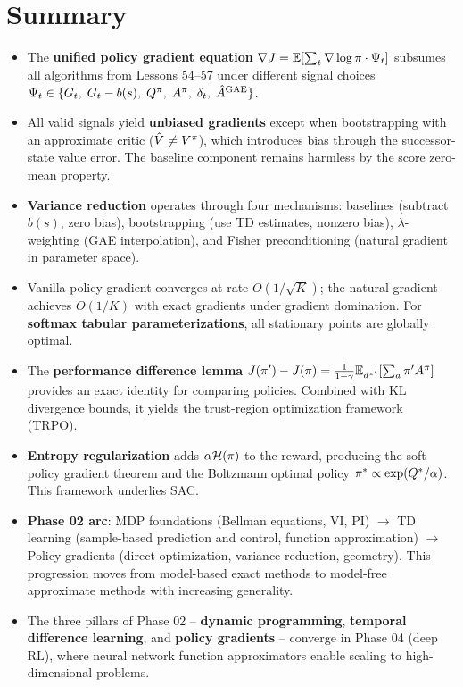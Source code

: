 \documentclass[11pt,a4paper]{article}
\begin{document}
\section{Summary}

\begin{itemize}
  \item The \textbf{unified policy gradient equation}
    $\nabla J = \mathbb{E}[\sum_t \nabla \log \pi \cdot \Psi_t]$ subsumes
    all algorithms from Lessons 54--57 under different signal choices
    $\Psi_t \in \{G_t,\; G_t - b(s),\; Q^{\pi},\; A^\pi,\;
    \delta_t,\; \hat{A}^{\mathrm{GAE}}\}$.

  \item All valid signals yield \textbf{unbiased gradients} except
    when bootstrapping with an approximate critic ($\hat{V} \neq V^{\pi}$),
    which introduces bias through the successor-state value error.
    The baseline component remains harmless by the score zero-mean
    property.

  \item \textbf{Variance reduction} operates through four mechanisms:
    baselines (subtract $b(s)$, zero bias), bootstrapping (use TD
    estimates, nonzero bias), $\lambda$-weighting (GAE interpolation),
    and Fisher preconditioning (natural gradient in parameter space).

  \item Vanilla policy gradient converges at rate $O(1/\sqrt{K})$; the
    natural gradient achieves $O(1/K)$ with exact gradients under
    gradient domination. For \textbf{softmax tabular parameterizations},
    all stationary points are globally optimal.

  \item The \textbf{performance difference lemma}
    $J(\pi') - J(\pi) = \frac{1}{1-\gamma}
    \mathbb{E}_{d^{\pi'}}[\sum_a \pi' A^\pi]$ provides an exact
    identity for comparing policies. Combined with KL divergence
    bounds, it yields the trust-region optimization framework (TRPO).

  \item \textbf{Entropy regularization} adds $\alpha \mathcal{H}(\pi)$
    to the reward, producing the soft policy gradient theorem and the
    Boltzmann optimal policy $\pi^* \propto \exp(Q^*/\alpha)$.
    This framework underlies SAC.

  \item \textbf{Phase 02 arc}: MDP foundations (Bellman equations,
    VI, PI) $\to$ TD learning (sample-based prediction and control,
    function approximation) $\to$ Policy gradients (direct optimization,
    variance reduction, geometry). This progression moves from
    model-based exact methods to model-free approximate methods with
    increasing generality.

  \item The three pillars of Phase 02 -- \textbf{dynamic programming},
    \textbf{temporal difference learning}, and \textbf{policy gradients}
    -- converge in Phase 04 (deep RL), where neural network function
    approximators enable scaling to high-dimensional problems.
\end{itemize}
\end{document}
